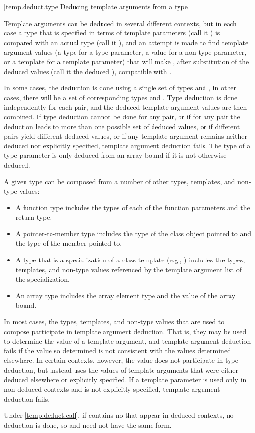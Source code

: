 [temp.deduct.type]{Deducing template arguments from a type}

\pnum
Template arguments can be deduced in several different contexts, but
in each case a type that is specified in terms of template parameters
(call it
)
is compared with an actual type (call it
),
and an attempt is made to find template argument values (a type for a type
parameter, a value for a non-type parameter, or a template for a
template parameter) that will make
,
after substitution of the deduced values (call it the deduced
),
compatible with
.

\pnum
In some cases, the deduction is done using a single set of types
and
,
in other cases, there will be a set of corresponding types
and
.
Type deduction is done
independently for each
pair, and the deduced template
argument values are then combined.
If type deduction cannot be done
for any
pair, or if for any pair the deduction leads to more than
one possible set of deduced values, or if different pairs yield
different deduced values, or if any template argument remains neither
deduced nor explicitly specified, template argument deduction fails.
The type of a type parameter
is only deduced from an array bound
if it is not otherwise deduced.

\pnum
A given type
can be composed from a number of other
types, templates, and non-type values:

\begin{itemize}
\item
A function type includes the types of each of the function parameters
and the return type.
\item
A pointer-to-member type includes the type of the class object pointed to
and the type of the member pointed to.
\item
A type that is a specialization of a class template (e.g.,
)
includes the types, templates, and non-type values referenced by the
template argument list of the specialization.
\item
An array type includes the array element type and the value of the
array bound.
\end{itemize}

\pnum
In most cases, the types, templates, and non-type values that are used
to compose
participate in template argument deduction.
That is,
they may be used to determine the value of a template argument, and
template argument deduction fails if
the value so determined is not consistent with the values determined
elsewhere.
In certain contexts, however, the value does not
participate in type deduction, but instead uses the values of template
arguments that were either deduced elsewhere or explicitly specified.
If a template parameter is used only in non-deduced contexts and is not
explicitly specified, template argument deduction fails.
\begin{note}
Under \ref{temp.deduct.call},
if  contains no  that appear
in deduced contexts, no deduction is done, so  and 
need not have the same form.
\end{note}

